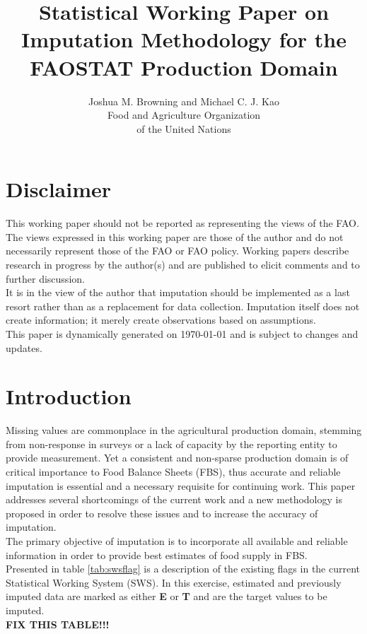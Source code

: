 \documentclass[nojss]{jss}\usepackage[]{graphicx}\usepackage[]{color}
\title{\bf Statistical Working Paper on Imputation Methodology for the
  FAOSTAT Production Domain}
\author{Joshua M. Browning and Michael C. J. Kao\\ Food and Agriculture Organization \\ of the United Nations}
\begin{document}
\section*{Disclaimer}
This working paper should not be reported as representing the views of
the FAO. The views expressed in this working paper are those of the
author and do not necessarily represent those of the FAO or FAO
policy. Working papers describe research in progress by the author(s) and
are published to elicit comments and to further discussion.\\

It is in the view of the author that imputation should be implemented
as a last resort rather than as a replacement for data
collection. Imputation itself does not create information; it merely
create observations based on assumptions.\\

This paper is dynamically generated on \today{} and is subject to
changes and updates.

\section{Introduction}
Missing values are commonplace in the agricultural production domain,
stemming from non-response in surveys or a lack of capacity by the
reporting entity to provide measurement. Yet a consistent and
non-sparse production domain is of critical importance to Food Balance
Sheets (FBS), thus accurate and reliable imputation is essential and a
necessary requisite for continuing work. This paper addresses several
shortcomings of the current work and a new methodology is proposed in
order to resolve these issues and to increase the accuracy of
imputation.\\

The primary objective of imputation is to incorporate all
available and reliable information in order to provide best estimates of
food supply in FBS.\\

Presented in table \ref{tab:swsflag} is a description of the existing
flags in the current Statistical Working System (SWS). In this
exercise, estimated and previously imputed data are marked as
either \textbf{E} or \textbf{T} and are the target values to
be imputed.\\

\textbf{FIX THIS TABLE!!!}
\end{document}
